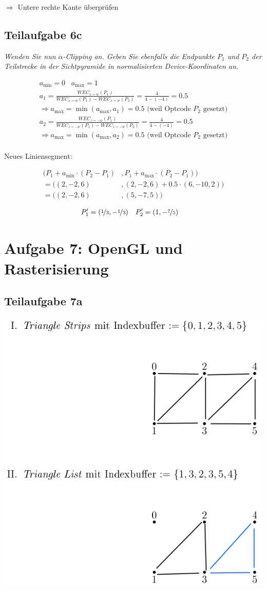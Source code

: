 \documentclass[a4paper]{scrartcl}
\begin{document}
$\Rightarrow$ Untere rechte Kante überprüfen

\subsection*{Teilaufgabe 6c}
\textit{Wenden Sie nun $\alpha$-Clipping an. Geben Sie ebenfalls die Endpunkte
$P_1$ und $P_2$ der Teilstrecke in der Sichtpyramide in normalisierten
Device-Koordinaten an.}

\begin{align}
    a_{\text{min}} = 0\;\;\; a_{\text{max}} = 1\\
    a_1 = \frac{WEC_{x=w}(P_1)}{WEC_{x=w}(P_1) - WEC_{x=w}(P_2)} = \frac{4}{4 - (-4)} = 0.5\\
    \Rightarrow a_{\text{max}} = \min(a_{\text{max}}, a_1) = 0.5 \text{ (weil Optcode } P_2 \text{ gesetzt)}\\
    a_2 = \frac{WEC_{z=-w}(P_1)}{WEC_{z=-w}(P_1) - WEC_{z=-w}(P_2)} = \frac{4}{4 - (-4)} = 0.5\\
    \Rightarrow a_{\text{max}} = \min(a_{\text{max}}, a_2) = 0.5 \text{ (weil Optcode } P_2 \text{ gesetzt)}\\
\end{align}

Neues Liniensegment:

\begin{align}
    (P_1 + a_{\text{min}} \cdot (P_2 - P_1)&, P_1 + a_{\text{max}} \cdot (P_2 - P_1))\\
  = ((2, -2, 6)&, (2, -2, 6) + 0.5 \cdot (6, -10, 2))\\
  = ((2, -2, 6)&, (5, -7, 5))
\end{align}

\begin{align}
    P_1' &= (\nicefrac{1}{3}, -\nicefrac{1}{3}) & P_2' &= (1, -\nicefrac{7}{5})
\end{align}

\clearpage
\section*{Aufgabe 7: OpenGL und Rasterisierung}
\subsection*{Teilaufgabe 7a}
\includegraphics*[width=0.5\linewidth, keepaspectratio]{7a.png}
\end{document}
